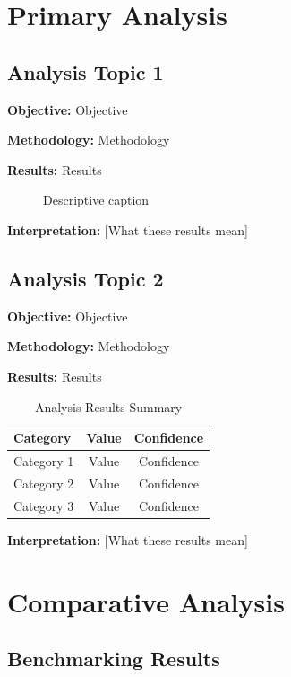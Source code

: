 \documentclass[11pt,letterpaper]{article}
\begin{document}
\section{Primary Analysis}

\subsection{Analysis Topic 1}

\textbf{Objective:} Objective

\textbf{Methodology:} Methodology

\textbf{Results:} Results

\begin{figure}
    \centering
    \caption{Descriptive caption}
    \label{fig:analysis1}
\end{figure}

\textbf{Interpretation:} [What these results mean]

\subsection{Analysis Topic 2}

\textbf{Objective:} Objective

\textbf{Methodology:} Methodology

\textbf{Results:} Results

\begin{table}
\centering
\begin{tabular}{@{}lcc@{}}
\toprule
\textbf{Category} & \textbf{Value} & \textbf{Confidence} \\
\midrule
Category 1 & Value & Confidence \\
Category 2 & Value & Confidence \\
Category 3 & Value & Confidence \\
\bottomrule
\end{tabular}
\caption{Analysis Results Summary}
\end{table}

\textbf{Interpretation:} [What these results mean]

\section{Comparative Analysis}

\subsection{Benchmarking Results}
\end{document}
